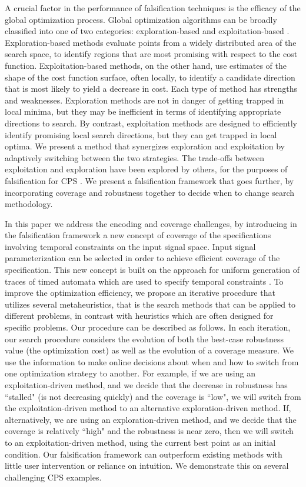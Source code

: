 A crucial factor in the performance of falsification techniques
is the efficacy of the global optimization process. Global
optimization algorithms can be broadly classified into one of two
categories: exploration-based and exploitation-based \cite{Blum03}.
Exploration-based methods evaluate points from a widely distributed
area of the search space, to identify regions that are most promising
with respect to the cost function. Exploitation-based methods, on the
other hand, use estimates of the shape of the cost function surface,
often locally, to identify a candidate direction that is most likely
to yield a decrease in cost. Each type of method has strengths and
weaknesses. Exploration methods are not in danger of getting trapped
in local minima, but they may be inefficient in terms of identifying
appropriate directions to search.  By contrast, exploitation methods
are designed to efficiently identify promising local search
directions, but they can get trapped in local optima.  We present a
method that synergizes exploration and exploitation by adaptively
switching between the two strategies.  The trade-offs between
exploitation and exploration have been explored by others, for the
purposes of falsification for CPS \cite{Ratschan14}. We present a
falsification framework that goes further, by incorporating coverage
and robustness together to decide when to change search methodology.

In this paper we address the encoding and coverage challenges, by
introducing in the falsification framework a new concept of coverage
of the specifications involving temporal constraints on the input
signal space. Input signal parameterization can be selected in order
to achieve efficient coverage of the specification. This new concept
is built on the approach for uniform generation of traces of timed
automata which are used to specify temporal constraints
\cite{BBBK16}. To improve the optimization efficiency, we propose an
iterative procedure that utilizes several metaheuristics, that is the
search methods that can be applied to different problems, in contrast
with heuristics which are often designed for specific problems. Our
procedure can be described as follows.  In each iteration, our search
procedure considers the evolution of both the best-case robustness
value (the optimization cost) as well as the evolution of a coverage
measure.  We use the information to make online decisions about when
and how to switch from one optimization strategy to another.  For
example, if we are using an exploitation-driven method, and we decide
that the decrease in robustness has ``stalled" (is not decreasing
quickly) and the coverage is ``low", we will switch from the
exploitation-driven method to an alternative exploration-driven
method.  If, alternatively, we are using an exploration-driven method,
and we decide that the coverage is relatively ``high" and the
robustness is near zero, then we will switch to an exploitation-driven
method, using the current best point as an initial condition.  Our
falsification framework can outperform existing methods with little
user intervention or reliance on intuition. We demonstrate this on
several challenging CPS examples.

